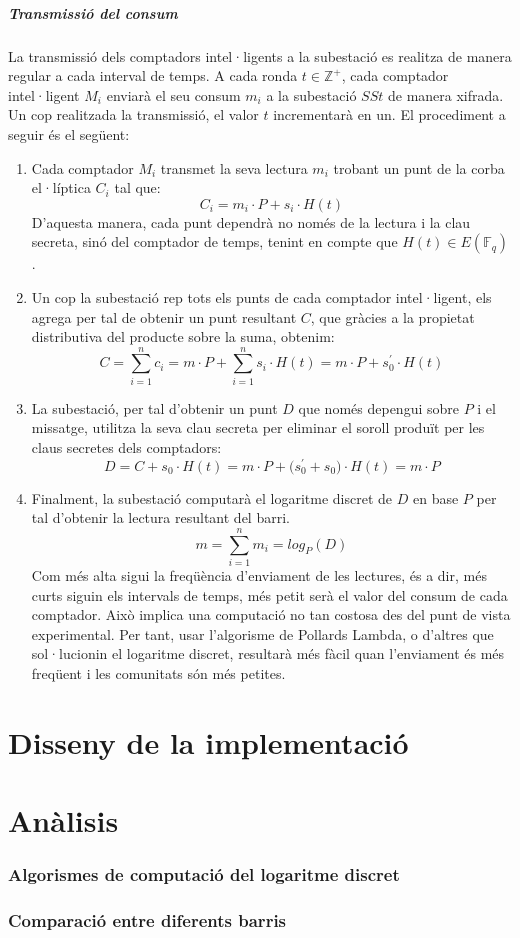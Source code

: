 \documentclass{article}
\begin{document}
\subsubsection{Transmissió del consum}\label{section:ct}
La transmissió dels comptadors intel·ligents a la subestació es realitza de manera regular a cada interval de temps. A cada ronda $t \in \mathbb{Z^+}$, cada comptador intel·ligent $M_i$ enviarà el seu consum $m_i$ a la subestació $SSt$ de manera xifrada. Un cop realitzada la transmissió, el valor $t$ incrementarà en un. El procediment a seguir és el següent:
\begin{enumerate}
	\item Cada comptador $M_i$ transmet la seva lectura $m_i$ trobant un punt de la corba el·líptica $C_i$ tal que:
	\[C_i = m_i \cdot P + s_i \cdot H(t)\]
	D'aquesta manera, cada punt dependrà no només de la lectura i la clau secreta, sinó del comptador de temps, tenint en compte que $H(t) \in E(\mathbb{F}_q)$.
	\item Un cop la subestació rep tots els punts de cada comptador intel·ligent, els agrega per tal de obtenir un punt resultant $C$, que gràcies a la propietat distributiva del producte sobre la suma, obtenim:
	\[C = \sum_{i=1}^{n}c_i = m \cdot P + \sum_{i=1}^{n}s_i \cdot H(t) = m \cdot P + s_0^{'}\cdot H(t)\]
	\item La subestació, per tal d'obtenir un punt $D$ que només depengui sobre $P$ i el missatge, utilitza la seva clau secreta per eliminar el soroll produït per les claus secretes dels comptadors:
	\[D = C + s_0 \cdot H(t) = m \cdot P + \big( s_0^{'} + s_0 \big) \cdot H(t) = m \cdot P\]
	\item Finalment, la subestació computarà el logaritme discret de $D$ en base $P$ per tal d'obtenir la lectura resultant del barri.
	\[m = \sum_{i=1}^{n} m_i = log_P(D)\]
	Com més alta sigui la freqüència d'enviament de les lectures, és a dir, més curts siguin els intervals de temps, més petit serà el valor del consum de cada comptador. Això implica una computació no tan costosa des del punt de vista experimental. Per tant, usar l'algorisme de Pollards Lambda, o d'altres que sol·lucionin el logaritme discret, resultarà més fàcil quan l'enviament és més freqüent i les comunitats són més petites.
\end{enumerate}

\newpage\part{Disseny de la implementació}\label{part:disseny}

\newpage\part{Anàlisis}\label{part:analisis}

\section{Algorismes de computació del logaritme discret}
\section{Comparació entre diferents barris}


\end{document}
